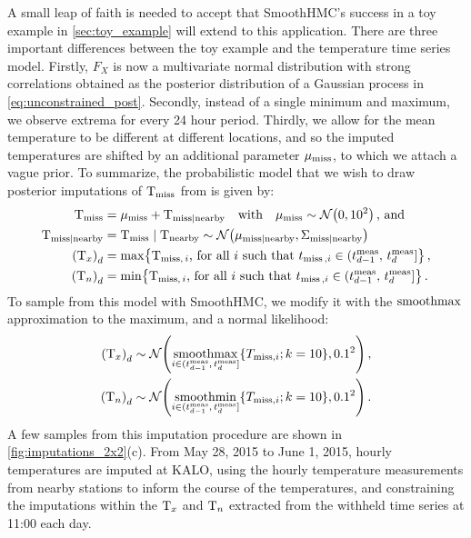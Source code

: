 A small leap of faith is needed to accept that SmoothHMC's success in a toy example in \autoref{sec:toy_example} will extend to this application.
There are three important differences between the toy example and the temperature time series model.
Firstly, \(F_X\) is now a multivariate normal distribution with strong correlations obtained as the posterior distribution of a Gaussian process in \autoref{eq:unconstrained_post}.
Secondly, instead of a single minimum and maximum, we observe extrema for every 24 hour period.
Thirdly, we allow for the mean temperature to be different at different locations,
and so the imputed temperatures are shifted by an additional parameter \(\mu_{\mathrm{miss}}\),
to which we attach a vague prior.
To summarize, the probabilistic model that we wish to draw posterior imputations of \(\mathrm{T}_{\mathrm{miss}}\) from is given by:
\begin{equation}
\begin{split}
    \Temp_\miss &= \mu_\miss + \Temp_{\miss \mid \obs} 
        \quad\text{with}\quad 
        \mu_{\miss} \sim \normal\del{0,10^2}
    \,\text{, and} \\
    \Temp_{\miss \mid \obs} &= \Temp_{\miss} \mid \Temp_\obs \sim \normal\del{\mu_{\miss \mid \obs}, \Sigma_{\miss \mid \obs}}\, \\
    \del{\Tx}_{\iday} &= \max\cbr{\Temp_{\miss,\,i}\text{, for all \(i\) such that } t_{\miss\,,i} \in \dayset{\iday}} \,,\\
    \del{\Tn}_{\iday} &= \min\cbr{\Temp_{\miss,\,i}\text{, for all \(i\) such that } t_{\miss\,,i} \in \dayset{\iday}} \,.
\end{split}
\label{eq:idealmodel}
\end{equation}
To sample from this model with SmoothHMC, we modify it with the \(\operatorname*{smoothmax}\) approximation to the maximum, and a normal likelihood:
\begin{equation}
\begin{split}
    \del{\Tx}_{\iday} &\sim \normal\del{\softmax_{i \in \dayset{\iday}} \cbr{ T_{\miss,i}; k=10}, 0.1^2}\,, \\
    \del{\Tn}_{\iday} &\sim \normal\del{\softmin_{i \in \dayset{\iday}} \cbr{ T_{\miss,i}; k=10}, 0.1^2}\,.
\end{split}
\label{eq:smoothed_model}
\end{equation}
A few samples from this imputation procedure are shown in \autoref{fig:imputations_2x2}(c).
From May 28, 2015 to June 1, 2015, hourly temperatures are imputed at KALO, using the hourly temperature measurements from nearby stations to inform the course of the temperatures, and constraining the imputations within the \(\mathrm{T}_{x}\) and \(\mathrm{T}_{n}\) extracted from the withheld time series at 11:00 each day.
